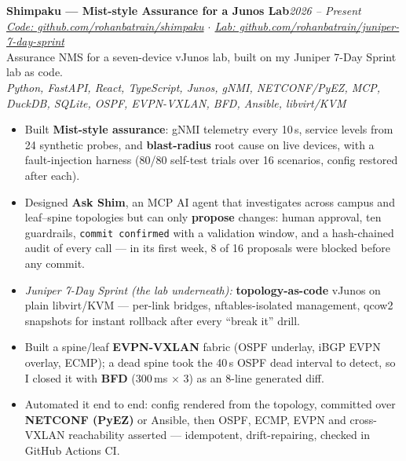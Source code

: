 \documentclass[10pt,a4paper]{article}
\newcommand{\entry}[3]{%
  \textbf{#1}\hfill\textit{\small #2}\\[-0.15em]
  {\small #3}\par\vspace{0.08em}%
}
\begin{document}
\entry{Shimpaku --- Mist-style Assurance for a Junos Lab}{2026 -- Present}{\textit{\href{https://github.com/rohanbatrain/shimpaku}{Code: github.com/rohanbatrain/shimpaku} \;$\cdot$\; \href{https://github.com/rohanbatrain/juniper-7-day-sprint}{Lab: github.com/rohanbatrain/juniper-7-day-sprint}}\\ Assurance NMS for a seven-device vJunos lab, built on my Juniper 7-Day Sprint lab as code.\\ \textit{Python, FastAPI, React, TypeScript, Junos, gNMI, NETCONF/PyEZ, MCP, DuckDB, SQLite, OSPF, EVPN-VXLAN, BFD, Ansible, libvirt/KVM}}
\begin{itemize}
  \item Built \textbf{Mist-style assurance}: gNMI telemetry every 10\,s, service levels from 24 synthetic probes, and \textbf{blast-radius} root cause on live devices, with a fault-injection harness (80/80 self-test trials over 16 scenarios, config restored after each).
  \item Designed \textbf{Ask Shim}, an MCP AI agent that investigates across campus and leaf--spine topologies but can only \textbf{propose} changes: human approval, ten guardrails, \texttt{commit confirmed} with a validation window, and a hash-chained audit of every call --- in its first week, 8 of 16 proposals were blocked before any commit.
  \item \textit{Juniper 7-Day Sprint (the lab underneath):} \textbf{topology-as-code} vJunos on plain libvirt/KVM --- per-link bridges, nftables-isolated management, qcow2 snapshots for instant rollback after every ``break it'' drill.
  \item Built a spine/leaf \textbf{EVPN-VXLAN} fabric (OSPF underlay, iBGP EVPN overlay, ECMP); a dead spine took the 40\,s OSPF dead interval to detect, so I closed it with \textbf{BFD} (300\,ms $\times$ 3) as an 8-line generated diff.
  \item Automated it end to end: config rendered from the topology, committed over \textbf{NETCONF (PyEZ)} or Ansible, then OSPF, ECMP, EVPN and cross-VXLAN reachability asserted --- idempotent, drift-repairing, checked in GitHub Actions CI.
\end{itemize}
\end{document}
